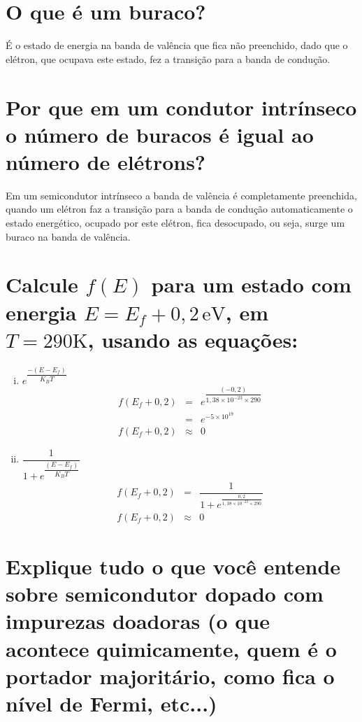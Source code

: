 \section*{O que é um buraco?}
\label{q14}

É o estado de energia na banda de valência que fica não preenchido,
dado que o elétron, que ocupava este estado, fez a transição para a
banda de condução.

\section*{Por que em um condutor intrínseco o número de buracos é
  igual ao número de elétrons?}
\label{q15}

Em um semicondutor intrínseco a banda de valência é completamente
preenchida, quando um elétron faz a transição para a banda de condução
automaticamente o estado energético, ocupado por este elétron, fica
desocupado, ou seja, surge um buraco na banda de valência.

\section*{Calcule $f(E)$ para um estado com energia $E = E_{f} + 0,2
  \, \si{\electronvolt}$, em $T = 290 \si{\kelvin}$, usando as equações:}
\label{q16}

\begin{enumerate}[i)]
\item $e^{\dfrac{-(E - E_{f})}{K_{B}T}}$
  \begin{eqnarray*}
    f(E_{f} + 0,2) & = & e^{{\dfrac{(-0,2)}
                         {1,38 \times 10^{-23} \times 290}}} \\
    \nonumber
                  & = & e^{-5 \times 10^{19}} \\ \nonumber
    f(E_{f} + 0,2) & \approx & 0
  \end{eqnarray*}
\item $\dfrac{1}{1 + e^{\dfrac{(E - E_{f})}{K_{B}T}}}$
  \begin{eqnarray*}
    f(E_{f} + 0,2) & = & \dfrac{1}{1 + e^{\frac{0,2}
                         {1,38 \times 10^{-23} \times 290}}} \\
    \nonumber
    f(E_{f} + 0,2) & \approx & 0 \nonumber
  \end{eqnarray*}
\end{enumerate}

\section*{Explique tudo o que você entende sobre semicondutor dopado com impurezas
doadoras (o que acontece quimicamente, quem é o portador majoritário, como fica o
nível de Fermi, etc...)}
\label{q17}

